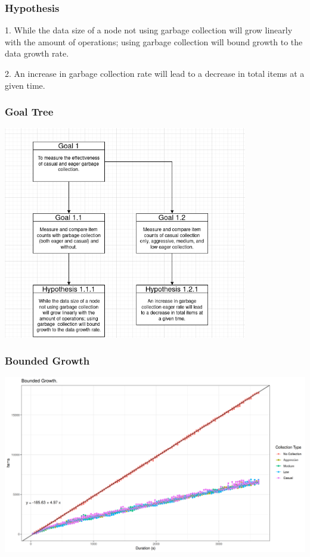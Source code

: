 \documentclass{beamer}
\begin{document}
    \begin{frame}[shrink]
        \frametitle{Hypothesis}
        \begin{center}
        \begin{minipage}{4in}
        1. While the data size of a node not using garbage collection
        will grow linearly with the amount of operations; using garbage
        collection will bound growth to the data growth rate.

        \bigskip

        2. An increase in garbage collection rate will lead to a
        decrease in total items at a given time.
        \end{minipage}
        \end{center}
    \end{frame}

    \begin{frame}[shrink]
        \frametitle{Goal Tree}
        \begin{center}
            \includegraphics[width=0.8\textwidth]{GoalTree}
        \end{center}
    \end{frame}


    \begin{frame}
        \frametitle{Bounded Growth}
        \includegraphics[width=\textwidth]{BoundedGrowth1_2}
    \end{frame}
\end{document}
